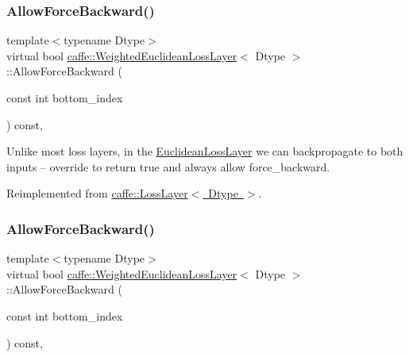\subsubsection{\texorpdfstring{Allow\+Force\+Backward()}{AllowForceBackward()}\hspace{0.1cm}{\footnotesize\ttfamily [1/2]}}
{\footnotesize\ttfamily template$<$typename Dtype$>$ \\
virtual bool \mbox{\hyperlink{classcaffe_1_1_weighted_euclidean_loss_layer}{caffe\+::\+Weighted\+Euclidean\+Loss\+Layer}}$<$ Dtype $>$\+::Allow\+Force\+Backward (\begin{DoxyParamCaption}\item[{const int}]{bottom\+\_\+index }\end{DoxyParamCaption}) const\hspace{0.3cm}{\ttfamily [inline]}, {\ttfamily [virtual]}}

Unlike most loss layers, in the \mbox{\hyperlink{classcaffe_1_1_euclidean_loss_layer}{Euclidean\+Loss\+Layer}} we can backpropagate to both inputs -- override to return true and always allow force\+\_\+backward. 

Reimplemented from \mbox{\hyperlink{classcaffe_1_1_loss_layer_a36d35155bfe0de53a79c517f33759612}{caffe\+::\+Loss\+Layer$<$ Dtype $>$}}.

\mbox{\label{classcaffe_1_1_weighted_euclidean_loss_layer_a6b996834a2a27bb8d2d9b48873b6cd65}} 
\subsubsection{\texorpdfstring{Allow\+Force\+Backward()}{AllowForceBackward()}\hspace{0.1cm}{\footnotesize\ttfamily [2/2]}}
{\footnotesize\ttfamily template$<$typename Dtype$>$ \\
virtual bool \mbox{\hyperlink{classcaffe_1_1_weighted_euclidean_loss_layer}{caffe\+::\+Weighted\+Euclidean\+Loss\+Layer}}$<$ Dtype $>$\+::Allow\+Force\+Backward (\begin{DoxyParamCaption}\item[{const int}]{bottom\+\_\+index }\end{DoxyParamCaption}) const\hspace{0.3cm}{\ttfamily [inline]}, {\ttfamily [virtual]}}

